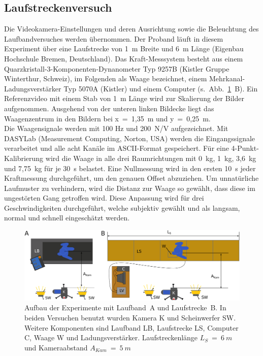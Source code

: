 \subsection{Laufstreckenversuch}
Die Videokamera-Einstellungen und deren Ausrichtung sowie die Beleuchtung des Laufbandversuches werden übernommen. Der Proband läuft in diesem Experiment über eine Laufstrecke von 1~m Breite und 6~m Länge (Eigenbau Hochschule Bremen, Deutschland). Das Kraft-Messsystem besteht aus einem Quarzkristall-3-Komponenten-Dynanometer Typ 9257B (Kistler Gruppe Winterthur, Schweiz), im Folgenden als Waage bezeichnet, einem Mehrkanal-Ladungsverstärker Typ 5070A (Kistler) und einem Computer (s.~Abb.~\ref{fig:setup_combo}~B). Ein Referenzvideo mit einem Stab von 1~m Länge wird zur Skalierung der Bilder aufgenommen. Ausgehend von der unteren linken Bildecke liegt das Waagenzentrum in den Bildern bei x~=~1,35~m und y~=~0,25~m.\\
Die Waagensignale werden mit 100 Hz und 200~N/V aufgezeichnet. Mit DASYLab (Measurement Computing, Norton, USA) werden die Eingangssignale verarbeitet und alle acht Kanäle im ASCII-Format gespeichert. Für eine 4-Punkt-Kalibrierung wird die Waage in alle drei Raumrichtungen mit 0~kg, 1~kg, 3,6~kg und 7,75~kg für je 30~s belastet. Eine Nullmessung wird in den ersten 10~s jeder Kraftmessung durchgeführt, um den genauen Offset abzuziehen. Um unnatürliche Laufmuster zu verhindern, wird die Distanz zur Waage so gewählt, dass diese im ungestörten Gang getroffen wird. Diese Anpassung wird für drei Geschwindigkeiten durchgeführt, welche subjektiv gewählt und als langsam, normal und schnell eingeschätzt werden.
\begin{figure}[h!]
	\centering
	\includegraphics[width=\linewidth]{bilder/mat_met/Setup_combo}
	\caption[Aufbau Laufband- und Laufstreckenversuch]{Aufbau der Experimente mit Laufband~A und Laufstrecke~B. In beiden Versuchen benutzt wurden Kamera K und Scheinwerfer SW. Weitere Komponenten sind Laufband LB, Laufstrecke LS, Computer C, Waage W und Ladungsverstärker. Laufstreckenlänge $L_S~=~6~m$ und Kameraabstand $A_{Kam}~=~5~m$}
	\label{fig:setup_combo}
\end{figure}

